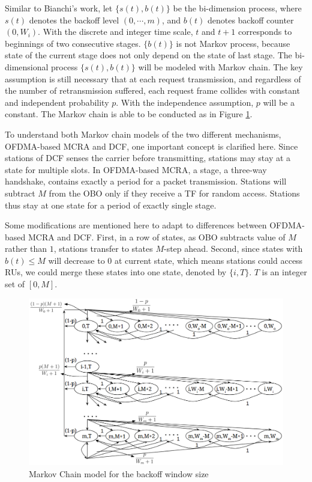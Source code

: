 \documentclass[journal]{IEEEtran}
\begin{document}
Similar to Bianchi's work, let $\lbrace s(t), b(t) \rbrace$ be the bi-dimension process, where $s(t)$ denotes the backoff level $(0,\cdots, m)$, and $b(t)$ denotes backoff counter $(0,W_i)$.
With the discrete and integer time scale, $t$ and $t+1$ corresponds to beginnings of two consecutive stages.
$\lbrace b(t) \rbrace$ is not Markov process, because state of the current stage does not only depend on the state of last stage. 
The bi-dimensional process $\lbrace s(t),b(t) \rbrace$ will be modeled with Markov chain.
The key assumption is still necessary that at each request transmission, and regardless of the number of retransmission suffered, each request frame collides with constant and independent probability $p$.
With the independence assumption, $p$ will be a constant. The Markov chain is able to be conducted as in Figure \ref{Markov}.

To understand both Markov chain models of the two different mechanisms, OFDMA-based MCRA and DCF, one important concept is clarified here. 
Since stations of DCF senses the carrier before transmitting, stations may stay at a state for multiple slots. 
In OFDMA-based MCRA, a stage, a three-way handshake, contains exactly a period for a packet transmission.
Stations will subtract $M$ from the OBO only if they receive a TF for random access. 
Stations thus stay at one state for a period of exactly single stage.

Some modifications are mentioned here to adapt to differences between OFDMA-based MCRA and DCF. 
First, in a row of states, as OBO subtracts value of $M$ rather than $1$, stations transfer to states $M$-step ahead.
Second, since states with $b(t)\leq M $ will decrease to $0$ at current state, which means stations could access RUs, we could merge these states into one state, denoted by $\lbrace i, T \rbrace$. $T$ is an integer set of $[0,M]$. 

\begin{figure}[!t]
\includegraphics[scale=.45]{./figure/Markov_chain.png}
\caption{Markov Chain model for the backoff window size}
\label{Markov}
\end{figure}
\end{document}
